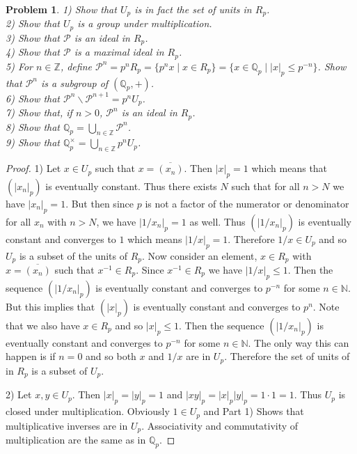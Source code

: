 \documentclass{article}
\newtheorem{problem}{Problem}
\begin{document}
\begin{flushleft}
\begin{problem}
1) Show that $U_p$ is in fact the set of units in $R_p$.\\
2) Show that $U_p$ is a group under multiplication.\\
3) Show that $\mathcal{P}$ is an ideal in $R_p$.\\
4) Show that $\mathcal{P}$ is a maximal ideal in $R_p$.\\
5) For $n \in \mathbb{Z}$, define $\mathcal{P}^n = p^n R_p = \{p^n x \mid x \in R_p\} = \{x \in \mathbb{Q}_p \mid |x|_p \leq p^{-n} \}$. Show that $\mathcal{P}^n$ is a subgroup of $(\mathbb{Q}_p, +)$.\\
6) Show that $\mathcal{P}^n \backslash \mathcal{P}^{n+1} = p^n U_p$.\\
7) Show that, if $n > 0$, $\mathcal{P}^n$ is an ideal in $R_p$.\\
8) Show that $\mathbb{Q}_p = \bigcup_{n \in \mathbb{Z}} \mathcal{P}^n$.\\
9) Show that $\mathbb{Q}_p^{\times} = \bigcup_{n \in \mathbb{Z}} p^n U_p$.
\end{problem}
\begin{proof}
1) Let $x \in U_p$ such that $x = \overline{(x_n)}$. Then $|x|_p = 1$ which means that $(|x_n|_p)$ is eventually constant. Thus there exists $N$ such that for all $n > N$ we have $|x_n|_p = 1$. But then since $p$ is not a factor of the numerator or denominator for all $x_n$ with $n > N$, we have $|1/x_n|_p = 1$ as well. Thus $(|1/x_n|_p)$ is eventually constant and converges to $1$ which means $|1/x|_p = 1$. Therefore $1/x \in U_p$ and so $U_p$ is a subset of the units of $R_p$. Now consider an element, $x \in R_p$ with $x = \overline{(x_n)}$ such that $x^{-1} \in R_p$. Since $x^{-1} \in R_p$ we have $|1/x|_p \leq 1$. Then the sequence $(|1/x_n|_p)$ is eventually constant and converges to $p^{-n}$ for some $n \in \mathbb{N}$. But this implies that $(|x|_p)$ is eventually constant and converges to $p^n$. Note that we also have $x \in R_p$ and so $|x|_p \leq 1$. Then the sequence $(|1/x_n|_p)$ is eventually constant and converges to $p^{-n}$ for some $n \in \mathbb{N}$. The only way this can happen is if $n = 0$ and so both $x$ and $1/x$ are in $U_p$. Therefore the set of units of in $R_p$ is a subset of $U_p$.\newline

2) Let $x, y \in U_p$. Then $|x|_p = |y|_p = 1$ and $|xy|_p = |x|_p |y|_p = 1 \cdot 1 = 1$. Thus $U_p$ is closed under multiplication. Obviously $1 \in U_p$ and Part 1) Shows that multiplicative inverses are in $U_p$. Associativity and commutativity of multiplication are the same as in $\mathbb{Q}_p$.\newline


\end{proof}
\end{flushleft}
\end{document}
